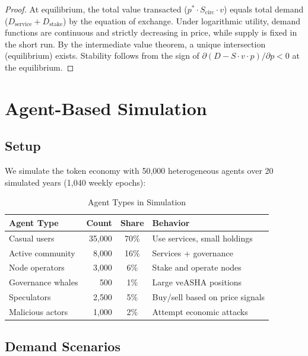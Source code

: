 \documentclass[11pt,a4paper]{article}
\begin{document}
\begin{proof}
At equilibrium, the total value transacted ($p^* \cdot S_{\text{circ}} \cdot v$) equals total demand ($D_{\text{service}} + D_{\text{stake}}$) by the equation of exchange. Under logarithmic utility, demand functions are continuous and strictly decreasing in price, while supply is fixed in the short run. By the intermediate value theorem, a unique intersection (equilibrium) exists. Stability follows from the sign of $\partial(D - S \cdot v \cdot p) / \partial p < 0$ at the equilibrium.
\end{proof}

\section{Agent-Based Simulation}

\subsection{Setup}

We simulate the token economy with 50{,}000 heterogeneous agents over 20 simulated years (1{,}040 weekly epochs):

\begin{table}[H]
\centering
\caption{Agent Types in Simulation}
\label{tab:agents}
\begin{tabular}{lrcl}
\toprule
\textbf{Agent Type} & \textbf{Count} & \textbf{Share} & \textbf{Behavior} \\
\midrule
Casual users & 35{,}000 & 70\% & Use services, small holdings \\
Active community & 8{,}000 & 16\% & Services + governance \\
Node operators & 3{,}000 & 6\% & Stake and operate nodes \\
Governance whales & 500 & 1\% & Large veASHA positions \\
Speculators & 2{,}500 & 5\% & Buy/sell based on price signals \\
Malicious actors & 1{,}000 & 2\% & Attempt economic attacks \\
\bottomrule
\end{tabular}
\end{table}

\subsection{Demand Scenarios}
\end{document}
